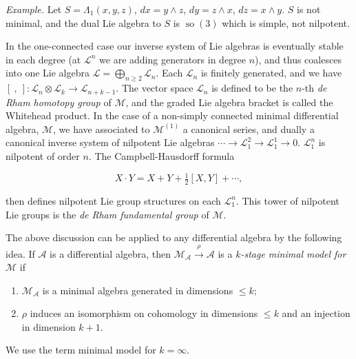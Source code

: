 \documentclass[
  english,
  a3paper,
  a3paper]{extarticle}
\begin{document}
\emph{Example.} Let \(S=\Lambda_1(x,y,z)\), \(dx=y\wedge z\),
\(dy=z\wedge x\), \(dz=x\wedge y\). \(S\) is not minimal, and the dual
Lie algebra to \(S\) is \(\operatorname{so}(3)\) which is simple, not
nilpotent.

In the one-connected case our inverse system of Lie algebras is
eventually stable in each degree (at \(\mathcal L^n\) we are adding
generators in degree \(n\)), and thus coalesces into one Lie algebra
\(\mathcal L=\bigoplus_{n\ge2}\mathcal L_n\). Each \(\mathcal L_n\) is
finitely generated, and we have
\([\ ,\ ]:\mathcal L_n\otimes\mathcal L_k\to\mathcal L_{n+k-1}\). The
vector space \(\mathcal L_n\) is defined to be the \(n\)-th \emph{de
Rham homotopy group} of \(\mathcal M\), and the graded Lie algebra
bracket is called the Whitehead product. In the case of a non-simply
connected minimal differential algebra, \(\mathcal M\), we have
associated to \(\mathcal M^{(1)}\) a canonical series, and dually a
canonical inverse system of nilpotent Lie algebras
\(\cdots\to\mathcal L_1^2\to\mathcal L_1^1\to0\). \(\mathcal L_1^n\) is
nilpotent of order \(n\). The Campbell-Hausdorff formula

\[
X\cdot Y=X+Y+\tfrac12[X,Y]+\cdots,
\]

then defines nilpotent Lie group structures on each \(\mathcal L_1^n\).
This tower of nilpotent Lie groups is the \emph{de Rham fundamental
group} of \(\mathcal M\).

The above discussion can be applied to any differential algebra by the
following idea. If \(\mathscr A\) is a differential algebra, then
\(\mathcal M_{\mathscr A}\xrightarrow{\rho}\mathscr A\) is a
\emph{\(k\)-stage minimal model for \(\mathcal M\)} if

\begin{enumerate}
\def\labelenumi{\arabic{enumi})}
\item
  \(\mathcal M_{\mathscr A}\) is a minimal algebra generated in
  dimensions \(\le k\);
\item
  \(\rho\) induces an isomorphism on cohomology in dimensions \(\le k\)
  and an injection in dimension \(k+1\).
\end{enumerate}

We use the term minimal model for \(k=\infty\).

\clearpage


\end{document}
